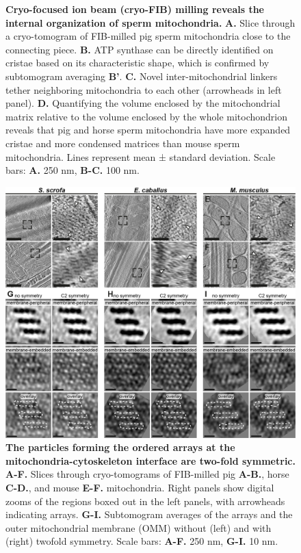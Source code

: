 \begin{subappendices}
\begin{figure}[hbt]
        \caption{\textbf{Cryo-focused ion beam (cryo-FIB) milling reveals the internal organization of sperm mitochondria.} \textbf{A.} Slice through a cryo-tomogram of FIB-milled pig sperm mitochondria close to the connecting piece. \textbf{B.} ATP synthase can be directly identified on cristae based on its characteristic shape, which is confirmed by subtomogram averaging \textbf{B'}. \textbf{C.} Novel inter-mitochondrial linkers tether neighboring mitochondria to each other (arrowheads in left panel). \textbf{D.} Quantifying the volume enclosed by the mitochondrial matrix relative to the volume enclosed by the whole mitochondrion reveals that pig and horse sperm mitochondria have more expanded cristae and more condensed matrices than mouse sperm mitochondria. Lines represent mean ± standard deviation. Scale bars: \textbf{A.} 250 nm, \textbf{B-C.} 100 nm.}
        \label{fig:ch4_app_fig2}
    \end{figure}
    \begin{figure}[hbt]
        \center
        \includegraphics[]{Chapter.4/Figures/SI_Figure3.png}
        \caption{\textbf{The particles forming the ordered arrays at the mitochondria-cytoskeleton interface are two-fold symmetric.} \textbf{A-F.} Slices through cryo-tomograms of FIB-milled pig \textbf{A-B.}, horse \textbf{C-D.}, and mouse \textbf{E-F.} mitochondria. Right panels show digital zooms of the regions boxed out in the left panels, with arrowheads indicating arrays. \textbf{G-I.} Subtomogram averages of the arrays and the outer mitochondrial membrane (OMM) without (left) and with (right) twofold symmetry. Scale bars: \textbf{A-F.} 250 nm, \textbf{G-I.} 10 nm.}

\end{figure}
\end{subappendices}
